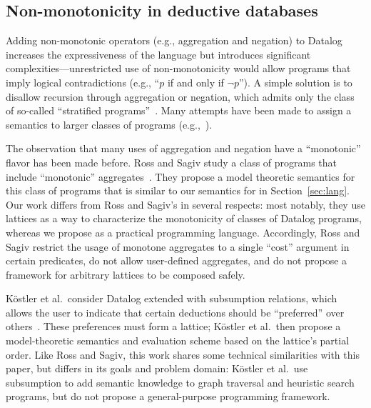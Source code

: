



\subsection{Non-monotonicity in deductive databases}
Adding non-monotonic operators (e.g., aggregation and negation) to Datalog
increases the expressiveness of the language but introduces significant
complexities---unrestricted use of non-monotonicity would allow programs that
imply logical contradictions (e.g., ``$p$ if and only if $\lnot p$''). A simple
solution is to disallow recursion through aggregation or negation, which admits
only the class of so-called ``stratified programs''~\cite{Apt1988}. Many
attempts have been made to assign a semantics to larger classes of programs
(e.g.,~\cite{Gelfond1988,Ross1990,VanGelder1991}).

The observation that many uses of aggregation and negation have a ``monotonic''
flavor has been made before. Ross and Sagiv study a class of programs that
include ``monotonic'' aggregates~\cite{Ross1992}. They propose a model theoretic
semantics for this class of programs that is similar to our semantics for
\lang in Section~\ref{sec:lang}. Our work differs from Ross and
Sagiv's in several respects: most notably, they use lattices as a way to
characterize the monotonicity of classes of Datalog programs, whereas we propose
\lang as a practical programming language. Accordingly, Ross and Sagiv restrict
the usage of monotone aggregates to a single ``cost'' argument in certain
predicates, do not allow user-defined aggregates, and do not propose a framework
for arbitrary lattices to be composed safely.

K\"{o}stler et al.\ consider Datalog extended with subsumption relations, which
allows the user to indicate that certain deductions should be ``preferred'' over
others~\cite{Kostler1995}. These preferences must form a lattice; K\"{o}stler et
al.\ then propose a model-theoretic semantics and evaluation scheme based on the
lattice's partial order. Like Ross and Sagiv, this work shares some technical
similarities with this paper, but differs in its goals and problem domain:
K\"{o}stler et al.\ use subsumption to add semantic knowledge to graph traversal
and heuristic search programs, but do not propose a general-purpose programming
framework.

